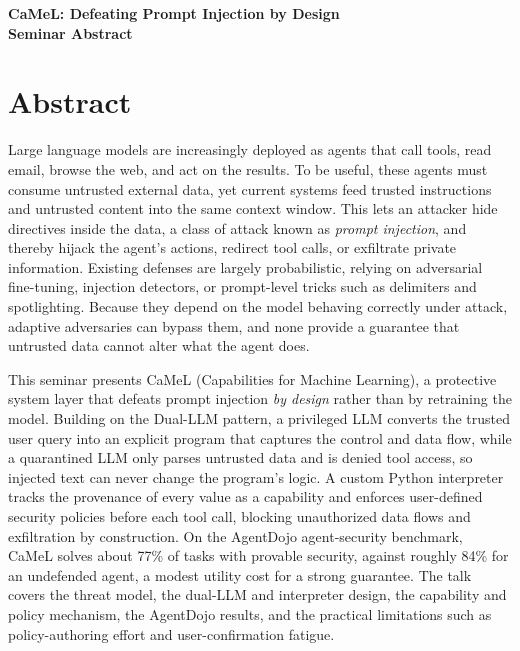 \documentclass[11pt]{article}
\begin{document}
\begin{center}
{\LARGE\bfseries CaMeL: Defeating Prompt Injection by Design}\\[1.1em]
{\large\bfseries Seminar Abstract}\\[0.6em]
{\normalsize \seminarDate}
\end{center}
\vspace{0.6em}
\section*{Abstract}
Large language models are increasingly deployed as agents that call tools, read email, browse the web, and act on the results. To be useful, these agents must consume untrusted external data, yet current systems feed trusted instructions and untrusted content into the same context window. This lets an attacker hide directives inside the data, a class of attack known as \emph{prompt injection}, and thereby hijack the agent's actions, redirect tool calls, or exfiltrate private information. Existing defenses are largely probabilistic, relying on adversarial fine-tuning, injection detectors, or prompt-level tricks such as delimiters and spotlighting. Because they depend on the model behaving correctly under attack, adaptive adversaries can bypass them, and none provide a guarantee that untrusted data cannot alter what the agent does.

This seminar presents CaMeL (Capabilities for Machine Learning), a protective system layer that defeats prompt injection \emph{by design} rather than by retraining the model. Building on the Dual-LLM pattern, a privileged LLM converts the trusted user query into an explicit program that captures the control and data flow, while a quarantined LLM only parses untrusted data and is denied tool access, so injected text can never change the program's logic. A custom Python interpreter tracks the provenance of every value as a capability and enforces user-defined security policies before each tool call, blocking unauthorized data flows and exfiltration by construction. On the AgentDojo agent-security benchmark, CaMeL solves about 77\% of tasks with provable security, against roughly 84\% for an undefended agent, a modest utility cost for a strong guarantee. The talk covers the threat model, the dual-LLM and interpreter design, the capability and policy mechanism, the AgentDojo results, and the practical limitations such as policy-authoring effort and user-confirmation fatigue.
\end{document}
